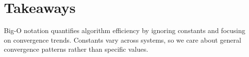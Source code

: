 \documentclass[12pt]{article}
\begin{document}
\section{Takeaways}

Big-O notation quantifies algorithm efficiency by ignoring constants and focusing 
on convergence trends. Constants vary across systems, so we care about general 
convergence patterns rather than specific values.
\end{document}
